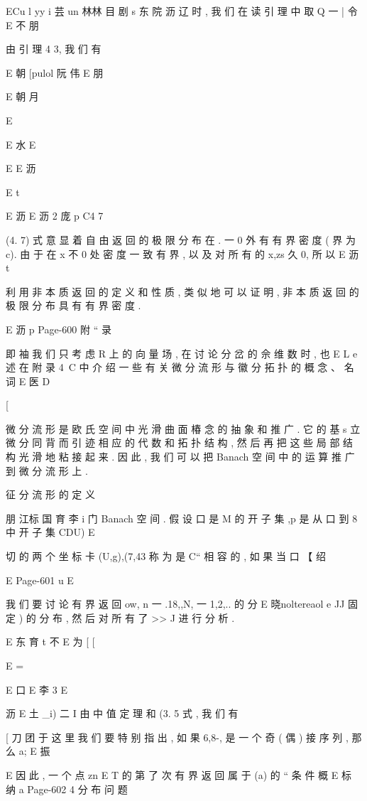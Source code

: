 {{ECu l yy i 芸
un 林林 目 剧
s 东 院 沥 辽
时 , 我 们 在 读 引 理 中 取 Q 一 | 令
E 不 朋

由 引 理 4 3, 我 们 有

E 朝
[pulol 阮 伟
E 朋

E 朝 月

E

E 水
E

E
E 沥

E
t

E 沥
E 沥 2 庞
p C4 7

(4. 7) 式 意 显 着 自 由 返 回 的 极 限 分 布 在 . 一 0 外 有 有 界 密 度 ( 界 为
c). 由 于 在 x 不 0 处 密 度 一 致 有 界 , 以 及 对 所 有 的 x,zs 久 0, 所 以
E 沥 t

利 用 非 本 质 返 回 的 定 义 和 性 质 , 类 似 地 可 以 证 明 , 非 本 质 返 回
的 极 限 分 布 具 有 有 界 密 度 .

E 沥 p
Page-600
附 “ 录

即 袖 我 们 只 考 虑 R 上 的 向 量 场 , 在 讨 论 分 岔 的 佘 维 数 时 , 也
E L e
述
在 附 录 4~C 中 介 绍 一 些 有 关 微 分 流 形 与 徽 分 拓 扑 的 概 念 、 名 词
E
医
D

[

微 分 流 形 是 欧 氏 空 间 中 光 滑 曲 面 椿 念 的 抽 象 和 推 广 . 它 的 基
s
立 微 分 同 背 而 引 迹 相 应 的 代 数 和 拓 扑 结 构 , 然 后 再 把 这 些 局 部 结
构 光 滑 地 粘 接 起 来 . 因 此 , 我 们 可 以 把 Banach 空 间 中 的 运 算 推 广
到 微 分 流 形 上 .

征 分 流 形 的 定 义

朋 江标 国 育 李 i 门
Banach 空 间 . 假 设 口 是 M 的 开 子 集 ,p 是 从 口 到 8 中 开 子 集 CDU)
E

切 的 两 个 坐 标 卡 (U,g),(7,43 称 为 是 C“ 相 容 的 , 如 果 当 口
【 绍

E
Page-601
u E

我 们 要 讨 论 有 界 返 回 {ow}, n 一 .18,,N, 一 1,2,.. 的 分
E 晓noltereaol e
JJ 固 定 ) 的 分 布 , 然 后 对 所 有 了 >> J 进 行 分 析 .

E 东 育
t 不
E
为
[
[

E ={

E
口
E 李 3
E

沥
E
土 _i) 二 I 由 中 值 定 理 和 (3. 5 式 , 我 们 有

[ 刀 团 于
这 里 我 们 要 特 别 指 出 , 如 果 {6,}8-, 是 一 个 奇 ( 偶 ) 接 序 列 , 那 么 a;
E 振

E
因 此 , 一 个 点 zn E T 的 第 了 次 有 界 返 回 属 于 (a) 的 “ 条 件 概
E 标 纳 a
Page-602
4 分 布 问 题

}}}

